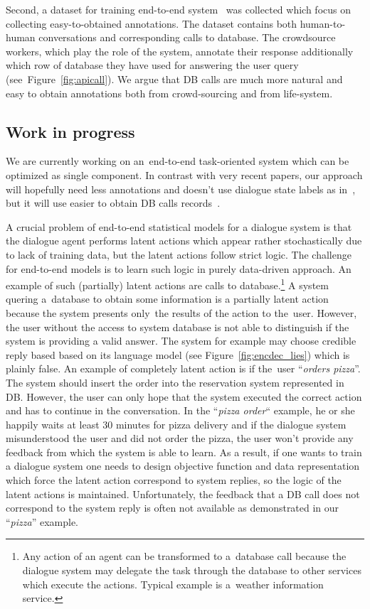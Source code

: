 \documentclass[11pt]{article}
\begin{document}
Second, a dataset for training end-to-end system~\cite{platek2016wochat} was collected which focus on collecting easy-to-obtained annotations.
The dataset contains both human-to-human conversations and corresponding calls to database.
The crowdsource workers, which play the role of the system, annotate their response additionally which row of database they have used for answering the user query (see~Figure~\ref{fig:apicall}).
We argue that DB calls are much more natural and easy to obtain annotations both from crowd-sourcing and from life-system. 

\subsection{Work in progress}\label{sec:wip}

We are currently working on an~end-to-end task-oriented system which can be optimized as single component.
In contrast with very recent papers, our approach will hopefully need less annotations and doesn't use dialogue state labels as in~\cite{wen_networkbased_2016}, but it will use easier to obtain DB calls records~\cite{platek2016wochat}.

A crucial problem of end-to-end statistical models for a dialogue system is that the dialogue agent performs latent actions which appear rather stochastically due to lack of training data, but the latent actions follow strict logic.
The challenge for end-to-end models is to learn such logic in purely data-driven approach.
An example of such (partially) latent actions are calls to database.\footnote{Any action of an agent can be transformed to a~database call because the dialogue system may delegate the task through the database to other services which execute the actions. Typical example is a~weather information service.}
A system quering a~database to obtain some information is a partially latent action because the system presents only~the results of the action to the~user.
However, the user without the access to system database is not able to distinguish if the system is providing a valid answer.
The system for example may choose credible reply based based on its language model (see Figure~\ref{fig:encdec_lies}) which is plainly false.
An example of completely latent action is if the~user ``{\it orders pizza}''.
The system should insert the order into the reservation system represented in DB.
However, the user can only hope that the system executed the correct action and has to continue in the conversation. 
In the ``{\it pizza order}`` example, he or she happily waits at least 30 minutes for pizza delivery and if the dialogue system misunderstood the user and did not order the pizza, the user won't provide any feedback from which the system is able to learn.
As a result, if one wants to train a dialogue system one needs to design objective function and data representation which force the latent action correspond to system replies, so the logic of the latent actions is maintained.
Unfortunately, the feedback that a DB call does not correspond to the system reply is often not available as demonstrated in our ``{\it pizza}'' example.
\end{document}
